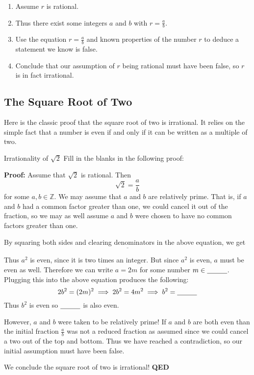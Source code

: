 \begin{enumerate}
\item Assume $r$ is rational.
\item Thus there exist some integers $a$ and $b$ with $r=\frac{a}{b}$.
\item Use the equation $r=\frac{a}{b}$ and known properties of the number $r$ to deduce a statement we know is false. 
\item Conclude that our assumption of $r$ being rational must have been false, so $r$ is in fact irrational.
\end{enumerate}

\subsection{The Square Root of Two}
Here is the classic proof that the square root of two is irrational.  It relies on the simple fact that a number is even if and only if it can be written as a multiple of two.  

\begin{exercise}{Irrationality of $\sqrt{2}$ \Coffeecup \Coffeecup \Coffeecup}
Fill in the blanks in the following proof:

\vspace*{.1in}

{\bf Proof: }  Assume that $\sqrt{2}$ is rational.  Then $$\sqrt{2}=\frac{a}{b}$$ for some $a,b \in \mathbb{Z}$.  We may assume that $a$ and $b$ are relatively prime.  That is, if $a$ and $b$ had a common factor greater than one, we could cancel it out of the fraction, so we may as well assume $a$ and $b$ were chosen to have no common factors greater than one.

By squaring both sides and clearing denominators in the above equation, we get $$ \underline{\hspace{2in}}$$

Thus $a^2$ is even, since it is two times an integer.  But since $a^2$ is even, $a$ must be even as well.  Therefore we can write $a=2m$ for some number $m \in \underline{\hspace{.4in}}$.  Plugging this into the above equation produces the following: $$2b^2=(2m)^2 \implies 2b^2 = 4m^2 \implies b^2 = \underline{\hspace{.4in}} $$  Thus $b^2$ is even so $\underline{\hspace{.4in}}$ is also even.

However, $a$ and $b$ were taken to be relatively prime!  If $a$ and $b$ are both even than the initial fraction $\frac{a}{b}$ was not a reduced fraction as assumed since we could cancel a two out of the top and bottom.  Thus we have reached a contradiction, so our initial assumption must have been false.

We conclude the square root of two is irrational!
{\bf QED}
\end{exercise}

